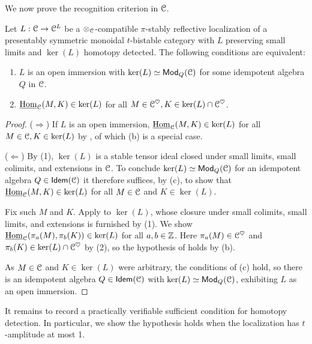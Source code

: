 We now prove the recognition criterion in $\EuScript{C}$.
\begin{theorem}\label{thm: smashing kernel recognition}
    Let $L:\EuScript{C}\to\EuScript{C}^{L}$ be a $\otimes_{\EuScript{C}}$-compatible $\pi$-stably reflective localization of a presentably symmetric monoidal $t$-bistable category with $L$ preserving small limits and $\ker(L)$ homotopy detected. The following conditions are equivalent:
    \begin{enumerate}[label=(\alph*)]
        \item $L$ is an open immersion with $\ker(L)\simeq\mathsf{Mod}_{Q}(\EuScript{C})$ for some idempotent algebra $Q$ in $\EuScript{C}$. 
        \item $\underline{\mathrm{Hom}}_{\EuScript{C}}(M,K)\in\ker(L)$ for all $M\in\EuScript{C}^{\heartsuit},K\in\ker(L)\cap\EuScript{C}^{\heartsuit}$. 
    \end{enumerate}
\end{theorem}
\begin{proof}
    ($\Rightarrow$) If $L$ is an open immersion, $\underline{\mathrm{Hom}}_{\EuScript{C}}(M, K)\in\ker(L)$ for all $M\in\EuScript{C},K\in\ker(L)$ by , of which (b) is a special case. 

    ($\Leftarrow$) By  (1), $\ker(L)$ is a stable tensor ideal closed under small limits, small colimits, and extensions in $\EuScript{C}$. To conclude $\ker(L)\simeq\mathsf{Mod}_{Q}(\EuScript{C})$ for an idempotent algebra $Q\in\mathsf{Idem}(\EuScript{C})$ it therefore suffices, by  (c), to show that $\underline{\mathrm{Hom}}_{\EuScript{C}}(M,K)\in\ker(L)$ for all $M\in\EuScript{C}$ and $K\in\ker(L)$. 

    Fix such $M$ and $K$. Apply  to $\ker(L)$, whose closure under small colimits, small limits, and extensions is furnished by  (1). We show $\underline{\mathrm{Hom}}_{\EuScript{C}}(\pi_{a}(M),\pi_{b}(K))\in\ker(L)$ for all $a,b\in\mathbb{Z}$. Here $\pi_{a}(M)\in\EuScript{C}^{\heartsuit}$ and $\pi_{b}(K)\in\ker(L)\cap\EuScript{C}^{\heartsuit}$ by  (2), so the hypothesis of  holds by (b). 

    As $M\in\EuScript{C}$ and $K\in\ker(L)$ were arbitrary, the conditions of  (c) hold, so there is an idempotent algebra $Q\in\mathsf{Idem}(\EuScript{C})$ with $\ker(L)\simeq\mathsf{Mod}_{Q}(\EuScript{C})$, exhibiting $L$ as an open immersion.
\end{proof}
It remains to record a practically verifiable sufficient condition for homotopy detection. In particular, we show the hypothesis holds when the localization has $t$-amplitude at most 1. 
